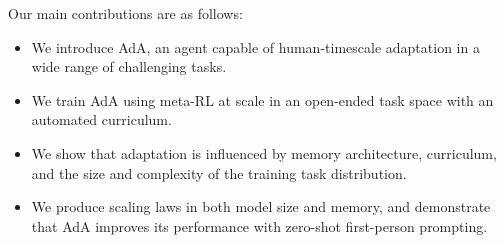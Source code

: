 Our main contributions are as follows:

\begin{itemize}
    \item We introduce AdA, an agent capable of human-timescale adaptation in a wide range of challenging tasks.
    \item We train AdA using meta-RL at scale in an open-ended task space with an automated curriculum.
    \item We show that adaptation is
    influenced by memory architecture, curriculum, and the size and complexity of the training task distribution.
    \item We produce scaling laws in both model size and memory, and demonstrate that AdA improves its performance with zero-shot first-person prompting. 
\end{itemize}